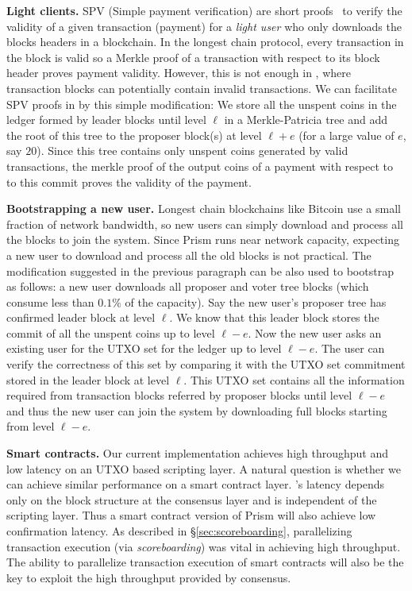 \noindent \textbf{Light clients.} 
 SPV (Simple payment verification) are short proofs~\cite{spv} to verify the validity of a given transaction (payment) for a \textit{light user} who only downloads the blocks headers in a blockchain.
In the longest chain protocol, every transaction in the block is valid so a Merkle proof of a transaction with respect to its block header proves payment validity.
However, this is not enough in \prism, where transaction blocks can potentially contain invalid transactions. We can facilitate SPV proofs in \prism by this simple modification: We store all the unspent coins in the ledger formed by leader blocks until level $\ell$ in a Merkle-Patricia tree and add the root of this tree to the proposer block(s) at level $\ell+e$ (for a large value of $e$, say $20$). Since this tree contains only unspent coins generated by valid transactions, the merkle proof of the output coins of a payment with respect to to this commit proves the validity of the payment.

\noindent \textbf{Bootstrapping a new user.} 
Longest chain blockchains like Bitcoin use a small fraction of network bandwidth, so new users can simply download and process all the blocks to join the system. 
Since Prism runs near network capacity,  expecting a new user to download and process all the old blocks is not practical. 
The modification suggested in the previous paragraph can be also used to bootstrap as follows: a new user downloads all proposer and voter tree blocks (which consume less than $0.1\%$ of the capacity). Say the new user's proposer tree has confirmed leader block at level $\ell$. 
We know that this leader block stores the commit of all the unspent coins up to level $\ell-e$. 
Now the new user asks an existing user for the UTXO set for the ledger up to level $\ell-e$. The user can verify the correctness of this set by comparing it with the UTXO set commitment stored in the leader block at level $\ell$.
This UTXO set contains all the information required from transaction blocks
referred by proposer blocks until level $\ell-e$ and thus the new user can join the system by downloading full blocks starting from level $\ell-e$.



\noindent \textbf{Smart contracts.} 
 Our current implementation achieves high throughput and low latency on an UTXO based scripting layer. 
 A natural question is whether we can achieve similar performance on a smart contract layer. 
 \prism's latency depends only on the block structure at the consensus layer and is independent of the scripting layer. Thus a smart contract version of Prism will also achieve low confirmation latency. As described in \S\ref{sec:scoreboarding}, parallelizing transaction execution (via \textit{scoreboarding}) was vital in achieving high throughput. The ability to parallelize transaction execution of smart contracts will also be the key to exploit the high throughput provided by \prism consensus. 
 
\fi